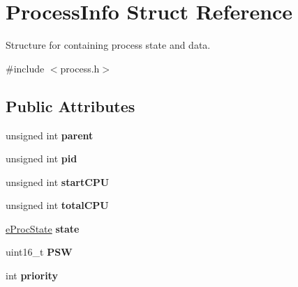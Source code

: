 \hypertarget{structProcessInfo}{\section{\-Process\-Info \-Struct \-Reference}
\label{dd/dc8/structProcessInfo}
}


\-Structure for containing process state and data.  




{\ttfamily \#include $<$process.\-h$>$}

\subsection*{\-Public \-Attributes}
\begin{DoxyCompactItemize}
\item 
\hypertarget{structProcessInfo_a102b9e7e7d958b508cec182bbcaf7d85}{unsigned int {\bfseries parent}}\label{dd/dc8/structProcessInfo_a102b9e7e7d958b508cec182bbcaf7d85}

\item 
\hypertarget{structProcessInfo_ab522cec1e6f7f3b6a7780e6b4611c1f4}{unsigned int {\bfseries pid}}\label{dd/dc8/structProcessInfo_ab522cec1e6f7f3b6a7780e6b4611c1f4}

\item 
\hypertarget{structProcessInfo_ac1e6244dd31274040bdf7ad7ee40db4a}{unsigned int {\bfseries start\-C\-P\-U}}\label{dd/dc8/structProcessInfo_ac1e6244dd31274040bdf7ad7ee40db4a}

\item 
\hypertarget{structProcessInfo_a8a6eda10132e07b1596c09822724b0c7}{unsigned int {\bfseries total\-C\-P\-U}}\label{dd/dc8/structProcessInfo_a8a6eda10132e07b1596c09822724b0c7}

\item 
\hypertarget{structProcessInfo_a748790bb8c3ef5d2dff552f35b81298e}{\hyperlink{process_8h_a2c72cb00af5be695c1f898162350821f}{e\-Proc\-State} {\bfseries state}}\label{dd/dc8/structProcessInfo_a748790bb8c3ef5d2dff552f35b81298e}

\item 
\hypertarget{structProcessInfo_af818acf9075de7c0100858908bcc2867}{uint16\-\_\-t {\bfseries \-P\-S\-W}}\label{dd/dc8/structProcessInfo_af818acf9075de7c0100858908bcc2867}

\item 
\hypertarget{structProcessInfo_a2f9f55dc3548d0bed66e06db8f47d958}{int {\bfseries priority}}\label{dd/dc8/structProcessInfo_a2f9f55dc3548d0bed66e06db8f47d958}


\end{DoxyCompactItemize}
